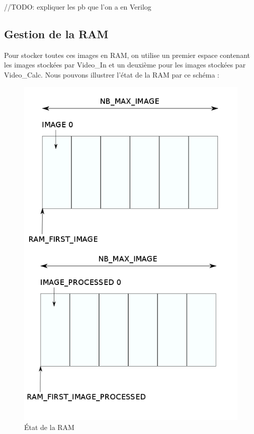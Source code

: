{{{//TODO: expliquer les pb que l'on a en Verilog
}
			\subsection*{Gestion de la RAM}
{
	Pour stocker toutes ces images en RAM, on utilise un premier espace contenant les images stockées par Video\_In et un deuxième pour les images stockées par Video\_Calc. Nous pouvons illustrer l'état de la RAM par ce schéma :

\begin{figure}[!h]
	\centering
	\includegraphics[scale = 0.3]{ram_management.png}
	\caption{État de la RAM}
\end{figure}

}}}

